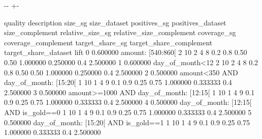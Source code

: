 \documentclass[letterpaper,10pt,english]{sphinxmanual}
\newlength\nbsphinxcodecellspacing
\begin{document}
{

\kern-\sphinxverbatimsmallskipamount\kern-\baselineskip
\kern+\FrameHeightAdjust\kern-\fboxrule
\vspace{\nbsphinxcodecellspacing}

\begin{sphinxVerbatim}[commandchars=\\\{\}]
\llap{\color{nbsphinxout}[8]:\,\hspace{\fboxrule}\hspace{\fboxsep}}    quality                             description  size\_sg  size\_dataset  positives\_sg  positives\_dataset  size\_complement  relative\_size\_sg  relative\_size\_complement  coverage\_sg  coverage\_complement  target\_share\_sg  target\_share\_complement  target\_share\_dataset      lift
0  0.600000                       amount: [540:860[        2            10             2                  4                8               0.2                       0.8         0.50                 0.50         1.000000                 0.250000                   0.4  2.500000
1  0.600000                         day\_of\_month<12        2            10             2                  4                8               0.2                       0.8         0.50                 0.50         1.000000                 0.250000                   0.4  2.500000
2  0.500000    amount<350 AND day\_of\_month: [15:20[        1            10             1                  4                9               0.1                       0.9         0.25                 0.75         1.000000                 0.333333                   0.4  2.500000
3  0.500000  amount>=1000 AND day\_of\_month: [12:15[        1            10             1                  4                9               0.1                       0.9         0.25                 0.75         1.000000                 0.333333                   0.4  2.500000
4  0.500000    day\_of\_month: [12:15[ AND is\_gold==0        1            10             1                  4                9               0.1                       0.9         0.25                 0.75         1.000000                 0.333333                   0.4  2.500000
5  0.500000    day\_of\_month: [15:20[ AND is\_gold==1        1            10             1                  4                9               0.1                       0.9         0.25                 0.75         1.000000                 0.333333                   0.4  2.500000

\end{sphinxVerbatim}}
\end{document}
